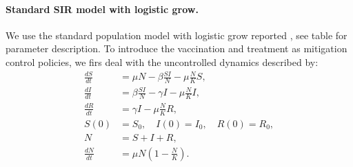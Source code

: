 \paragraph{Standard SIR model with logistic grow.}
We use the standard population model with logistic grow reported
\cite{Schaefer2009}, see table for parameter description. To introduce the 
vaccination and treatment as mitigation control policies, we firs deal with the
uncontrolled dynamics described by:
\begin{equation}\label{eqn:SIR}
	\begin{aligned}
		\frac{dS}{dt} &=
			\mu N  
			- \beta \frac{S I}{N} 
			- \mu \frac{N}{K} S ,
		\\
		\frac{dI}{dt} &=
			\beta \frac{S I}{N}
			- \gamma I
			- \mu \frac{N}{K} I,
		\\
		\frac{dR}{dt} &= 
			\gamma I 
			- \mu \frac{N}{K} R ,
		\\
		S(0) &= S_0, \quad
		I(0) = I_0, \quad
		R(0) = R_0,
		\\
		N &= S + I +R,
		\\
		\frac{dN}{dt} &=
			\mu N 
			\left(
				1 - \frac{N}{K}
			\right).
	\end{aligned}
\end{equation}

